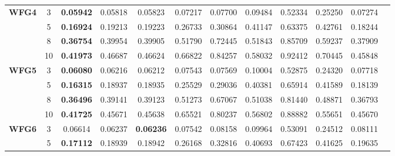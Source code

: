 \documentclass{sig-alternate}
\begin{document}
\begin{table*}[!htb]
\begin{tabular}{|c|c|c|c|c|c|c|c|c|c|c|c|}
		\multirow{4}{*}{\textbf{WFG4}}  & 3          & \textbf{0.05942} & 0.05818           & 0.05823               & 0.07217          & 0.07700             & 0.09484             & 0.52334            & 0.25250              & 0.07274          \\ \cline{2-11} 
		& 5          & \textbf{0.16924} & 0.19213           & 0.19223               & 0.26733          & 0.30864             & 0.41147             & 0.63375            & 0.42761              & 0.18244          \\ \cline{2-11} 
		& 8          & \textbf{0.36754} & 0.39954           & 0.39905               & 0.51790          & 0.72445             & 0.51843             & 0.85709            & 0.59237              & 0.37909          \\ \cline{2-11} 
		& 10         & \textbf{0.41973} & 0.46687           & 0.46624               & 0.66822          & 0.84257             & 0.58032             & 0.92412            & 0.70445              & 0.45848          \\ \hline
		\multirow{4}{*}{\textbf{WFG5}}  & 3          & \textbf{0.06080} & 0.06216           & 0.06212               & 0.07543          & 0.07569             & 0.10004             & 0.52875            & 0.24320              & 0.07718          \\ \cline{2-11} 
		& 5          & \textbf{0.16315} & 0.18937           & 0.18935               & 0.25529          & 0.29036             & 0.40381             & 0.65914            & 0.41589              & 0.18139          \\ \cline{2-11} 
		& 8          & \textbf{0.36496} & 0.39141           & 0.39123               & 0.51273          & 0.67067             & 0.51038             & 0.81440            & 0.48871              & 0.36793          \\ \cline{2-11} 
		& 10         & \textbf{0.41725} & 0.45671           & 0.45638               & 0.65521          & 0.80237             & 0.56802             & 0.88882            & 0.55651              & 0.45670          \\ \hline
		\multirow{4}{*}{\textbf{WFG6}}  & 3          & 0.06614          & 0.06237           & \textbf{0.06236}      & 0.07542          & 0.08158             & 0.09964             & 0.53091            & 0.24512              & 0.08111          \\ \cline{2-11} 
		& 5          & \textbf{0.17112} & 0.18939           & 0.18942               & 0.26168          & 0.32816             & 0.40693             & 0.67423            & 0.41625              & 0.19635          \\ \cline{2-11} 

\end{tabular}
\end{table*}
\end{document}
